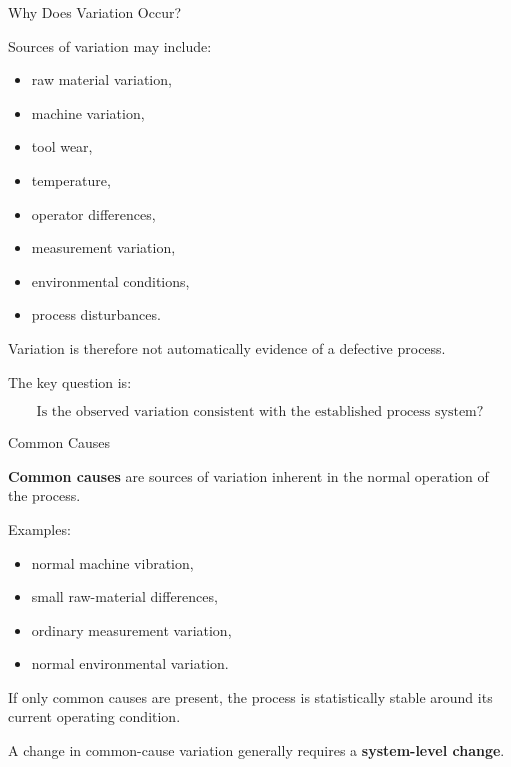 \documentclass[aspectratio=169,10pt]{beamer}
\begin{document}

\begin{frame}[shrink=18]{Why Does Variation Occur?}
\small

Sources of variation may include:

\begin{itemize}
    \item raw material variation,
    \item machine variation,
    \item tool wear,
    \item temperature,
    \item operator differences,
    \item measurement variation,
    \item environmental conditions,
    \item process disturbances.
\end{itemize}

Variation is therefore not automatically evidence of a defective
process.

The key question is:

\[
\boxed{
\text{Is the observed variation consistent with the established process system?}
}
\]

\end{frame}


\begin{frame}[shrink=18]{Common Causes}
\small

\textbf{Common causes} are sources of variation inherent in the
normal operation of the process.

Examples:

\begin{itemize}
    \item normal machine vibration,
    \item small raw-material differences,
    \item ordinary measurement variation,
    \item normal environmental variation.
\end{itemize}

If only common causes are present, the process is statistically
stable around its current operating condition.

\vspace{5pt}

A change in common-cause variation generally requires a
\textbf{system-level change}.

\end{frame}
\end{document}
